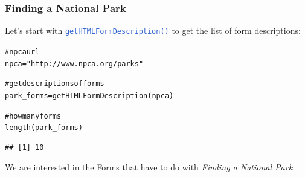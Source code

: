 \documentclass{beamer}\usepackage[]{graphicx}\usepackage[]{color}
\makeatletter
\newcommand{\hlstr}[1]{\textcolor[rgb]{0.063,0.58,0.627}{#1}}%
\newcommand{\hlcom}[1]{\textcolor[rgb]{0.588,0.588,0.588}{#1}}%
\newcommand{\hlstd}[1]{\textcolor[rgb]{0.196,0.196,0.196}{#1}}%
\newcommand{\hlkwb}[1]{\textcolor[rgb]{0.627,0,0.314}{#1}}%
\newcommand{\hlkwd}[1]{\textcolor[rgb]{0.78,0.227,0.412}{#1}}%
\newenvironment{kframe}{%
 \def\at@end@of@kframe{}%
 \ifinner\ifhmode%
  \def\at@end@of@kframe{\end{minipage}}%
  \begin{minipage}{\columnwidth}%
 \fi\fi%
 \def\FrameCommand##1{\hskip\@totalleftmargin \hskip-\fboxsep
 \colorbox{shadecolor}{##1}\hskip-\fboxsep
     \hskip-\linewidth \hskip-\@totalleftmargin \hskip\columnwidth}%
 \MakeFramed {\advance\hsize-\width
   \@totalleftmargin\z@ \linewidth\hsize
   \@setminipage}}%
 {\par\unskip\endMakeFramed%
 \at@end@of@kframe}
\newenvironment{knitrout}{}{} %
\newcommand{\low}[1]{\textcolor{lowlight}{#1}}
\newcommand{\highcode}[1]{\textcolor{highlight}{\texttt{#1}}}
\makeatother
\begin{document}
\begin{frame}[fragile]
\frametitle{Finding a National Park}

Let's start with \highcode{getHTMLFormDescription()} to get the list of form descriptions:

\begin{knitrout}\tiny
{}\color{fgcolor}\begin{kframe}
\begin{alltt}
\hlcom{# npca url}
\hlstd{npca} \hlkwb{=} \hlstr{"http://www.npca.org/parks"}

\hlcom{# get descriptions of forms}
\hlstd{park_forms} \hlkwb{=} \hlkwd{getHTMLFormDescription}\hlstd{(npca)}

\hlcom{# how many forms}
\hlkwd{length}\hlstd{(park_forms)}
\end{alltt}
\end{kframe}
\end{knitrout}

\begin{knitrout}\tiny
{}\color{fgcolor}\begin{kframe}
\begin{verbatim}
## [1] 10
\end{verbatim}
\end{kframe}
\end{knitrout}

\low{We are interested in the Forms that have to do with \textit{Finding a National Park}}
\end{frame}

\end{document}
